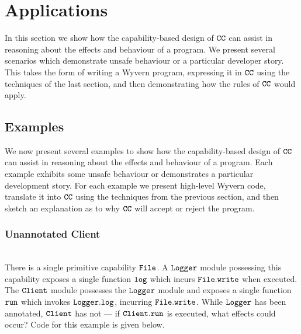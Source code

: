 
\section{Applications}

In this section we show how the capability-based design of $\mathtt{CC}$ can assist in reasoning about the effects and behaviour of a program. We present several scenarios which demonstrate unsafe behaviour or a particular developer story. This takes the form of writing a Wyvern program, expressing it in $\mathtt{CC}$ using the techniques of the last section, and then demonstrating how the rules of $\mathtt{CC}$ would apply. 


\subsection{Examples}

We now present several examples to show how the capability-based design of $\mathtt{CC}$ can assist in reasoning about the effects and behaviour of a program. Each example exhibits some unsafe behaviour or demonstrates a particular development story. For each example we present high-level Wyvern code, translate it into $\mathtt{CC}$ using the techniques from the previous section, and then sketch an explanation as to why $\mathtt{CC}$ will accept or reject the program.\\









































\subsubsection{Unannotated Client}~\\

There is a single primitive capability $\mathtt{File}$. A $\mathtt{Logger}$ module possessing this capability exposes a single function $\mathtt{log}$ which incurs $\mathtt{File.write}$ when executed. The $\mathtt{Client}$ module possesses the $\mathtt{Logger}$ module and exposes a single function $\mathtt{run}$ which invokes $\mathtt{Logger.log}$, incurring $\mathtt{File.write}$. While $\mathtt{Logger}$ has been annotated, $\mathtt{Client}$ has not --- if $\mathtt{Client.run}$ is executed, what effects could occur? Code for this example is given below. 

